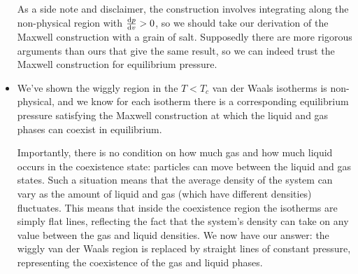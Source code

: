 \documentclass[11pt, a4paper]{article}
\begin{document}
\begin{itemize}
	As a side note and disclaimer, the construction involves integrating along the non-physical region with $ \dv{p}{v} > 0 $, so we should take our derivation of the Maxwell construction with a grain of salt. Supposedly there are more rigorous arguments than ours that give the same result, so we can indeed trust the Maxwell construction for equilibrium pressure.
	
	\item We've shown the wiggly region in the $ T < T_{c}$ van der Waals isotherms is non-physical, and we know for each isotherm there is a corresponding equilibrium pressure satisfying the Maxwell construction at which the liquid and gas phases can coexist in equilibrium. 
	
	Importantly, there is no condition on how much gas and how much liquid occurs in the coexistence state: particles can move between the liquid and gas states. Such a situation means that the average density of the system can vary as the amount of liquid and gas (which have different densities) fluctuates. This means that inside the coexistence region the isotherms are simply flat lines, reflecting the fact that the system's density can take on any value between the gas and liquid densities. We now have our answer: the wiggly van der Waals region is replaced by straight lines of constant pressure, representing the coexistence of the gas and liquid phases.
	
\end{itemize}
\end{document}
